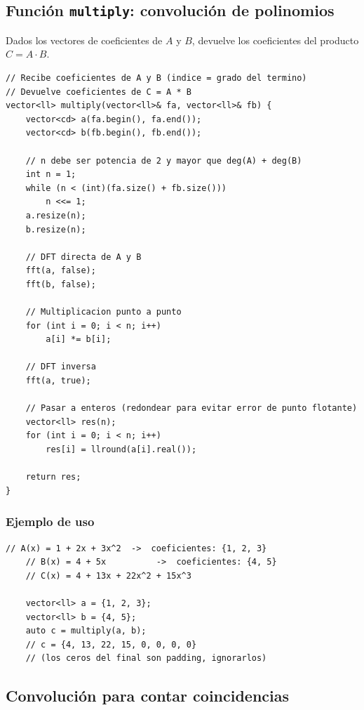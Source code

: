 \subsection{Función \texttt{multiply}: convolución de polinomios}

Dados los vectores de coeficientes de $A$ y $B$, devuelve los coeficientes del producto $C = A \cdot B$.

\begin{lstlisting}[style=cppstyle, caption={Multiplicacion de polinomios con FFT}]
// Recibe coeficientes de A y B (indice = grado del termino)
// Devuelve coeficientes de C = A * B
vector<ll> multiply(vector<ll>& fa, vector<ll>& fb) {
    vector<cd> a(fa.begin(), fa.end());
    vector<cd> b(fb.begin(), fb.end());

    // n debe ser potencia de 2 y mayor que deg(A) + deg(B)
    int n = 1;
    while (n < (int)(fa.size() + fb.size()))
        n <<= 1;
    a.resize(n);
    b.resize(n);

    // DFT directa de A y B
    fft(a, false);
    fft(b, false);

    // Multiplicacion punto a punto
    for (int i = 0; i < n; i++)
        a[i] *= b[i];

    // DFT inversa
    fft(a, true);

    // Pasar a enteros (redondear para evitar error de punto flotante)
    vector<ll> res(n);
    for (int i = 0; i < n; i++)
        res[i] = llround(a[i].real());

    return res;
}
\end{lstlisting}

\subsubsection*{Ejemplo de uso}

\begin{lstlisting}[style=cppstyle, caption={Multiplicar $(1 + 2x + 3x^2) \cdot (4 + 5x)$}]
    // A(x) = 1 + 2x + 3x^2  ->  coeficientes: {1, 2, 3}
    // B(x) = 4 + 5x          ->  coeficientes: {4, 5}
    // C(x) = 4 + 13x + 22x^2 + 15x^3

    vector<ll> a = {1, 2, 3};
    vector<ll> b = {4, 5};
    auto c = multiply(a, b);
    // c = {4, 13, 22, 15, 0, 0, 0, 0}
    // (los ceros del final son padding, ignorarlos)
\end{lstlisting}

\subsection{Convolución para contar coincidencias}

